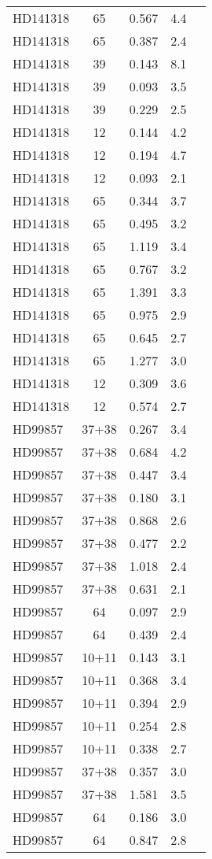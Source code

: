 \begin{table*}
\begin{tabular}{l c c c c}
HD141318 & 65 & 0.567 & 4.4\\ 
HD141318 & 65 & 0.387 & 2.4\\ 
HD141318 & 39 & 0.143 & 8.1\\ 
HD141318 & 39 & 0.093 & 3.5\\ 
HD141318 & 39 & 0.229 & 2.5\\ 
HD141318 & 12 & 0.144 & 4.2\\ 
HD141318 & 12 & 0.194 & 4.7\\ 
HD141318 & 12 & 0.093 & 2.1\\ 
HD141318 & 65 & 0.344 & 3.7\\ 
HD141318 & 65 & 0.495 & 3.2\\ 
HD141318 & 65 & 1.119 & 3.4\\ 
HD141318 & 65 & 0.767 & 3.2\\ 
HD141318 & 65 & 1.391 & 3.3\\ 
HD141318 & 65 & 0.975 & 2.9\\ 
HD141318 & 65 & 0.645 & 2.7\\ 
HD141318 & 65 & 1.277 & 3.0\\ 
HD141318 & 12 & 0.309 & 3.6\\ 
HD141318 & 12 & 0.574 & 2.7\\ 
\hline
HD99857 & 37+38 & 0.267 & 3.4\\ 
HD99857 & 37+38 & 0.684 & 4.2\\ 
HD99857 & 37+38 & 0.447 & 3.4\\ 
HD99857 & 37+38 & 0.180 & 3.1\\ 
HD99857 & 37+38 & 0.868 & 2.6\\ 
HD99857 & 37+38 & 0.477 & 2.2\\ 
HD99857 & 37+38 & 1.018 & 2.4\\ 
HD99857 & 37+38 & 0.631 & 2.1\\ 
HD99857 & 64 & 0.097 & 2.9\\ 
HD99857 & 64 & 0.439 & 2.4\\ 
HD99857 & 10+11 & 0.143 & 3.1\\ 
HD99857 & 10+11 & 0.368 & 3.4\\ 
HD99857 & 10+11 & 0.394 & 2.9\\ 
HD99857 & 10+11 & 0.254 & 2.8\\ 
HD99857 & 10+11 & 0.338 & 2.7\\ 
HD99857 & 37+38 & 0.357 & 3.0\\ 
HD99857 & 37+38 & 1.581 & 3.5\\ 
HD99857 & 64 & 0.186 & 3.0\\ 
HD99857 & 64 & 0.847 & 2.8\\ 

\end{tabular}
\end{table*}
